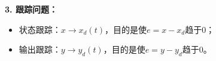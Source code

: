 \textbf{3. 跟踪问题：}
\begin{itemize}[leftmargin=1em]
    \item 状态跟踪：$x \rightarrow x_d (t)$，目的是使$e = x - x_d$趋于$0$；
    \item 输出跟踪：$y \rightarrow y_d (t)$，目的是使$e = y - y_d$趋于$0$。
\end{itemize}